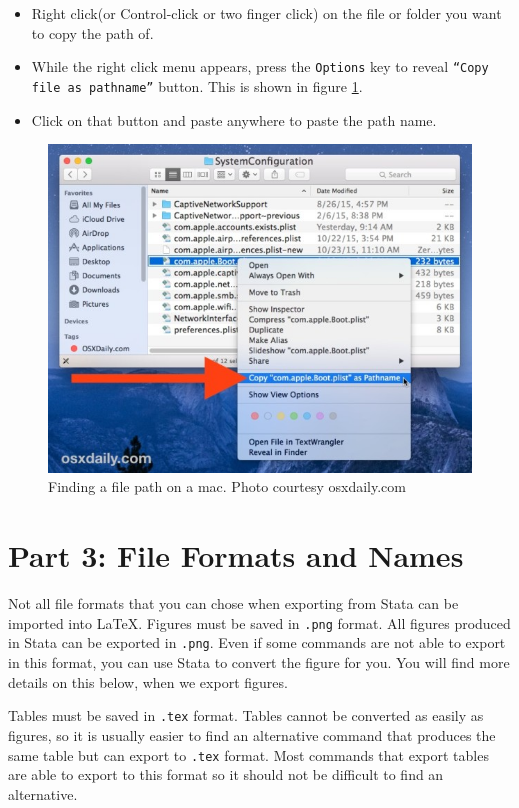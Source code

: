 \documentclass[]{article}
\begin{document}
\begin{itemize}
	\item Right click(or Control-click or two finger click) on the file or folder you want to copy the path of.
	\item While the right click menu appears, press the \texttt{Options} key to reveal \texttt{``Copy file as pathname''} button. This is shown in figure \ref{fig:filepathmac}.
	\item Click on that button and paste anywhere to paste the path name.
\end{itemize}
\begin{figure}
	\centering
	\includegraphics[width=0.7\linewidth]{../img/filepathmac}
	\caption{Finding a file path on a mac. Photo courtesy osxdaily.com}
	\label{fig:filepathmac}
\end{figure}

\section*{Part 3: File Formats and Names}
Not all file formats that you can chose when exporting from Stata can be imported into {\LaTeX}. Figures must be saved in \texttt{.png} format. All figures produced in Stata can be exported in \texttt{.png}. Even if some commands are not able to export in this format, you can use Stata to convert the figure for you. You will find more details on this below, when we export figures. 

Tables must be saved in \texttt{.tex} format. Tables cannot be converted as easily as figures, so it is usually easier to find an alternative command that produces the same table but can export to \texttt{.tex} format. Most commands that export tables are able to export to this format so it should not be difficult to find an alternative.
\end{document}

